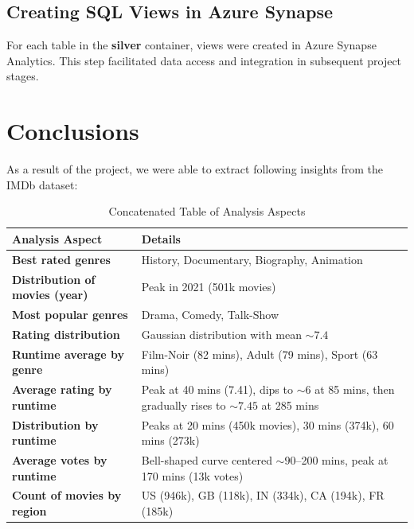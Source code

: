 \documentclass[a4paper,12pt]{article}
\begin{document}
\subsection{Creating SQL Views in Azure Synapse}
For each table in the \textbf{silver} container, views were created in Azure Synapse Analytics. This step facilitated data access and integration in subsequent project stages.

\section{Conclusions}
\label{sec:conclusions}

As a result of the project, we were able to extract following insights from the IMDb dataset:

\begin{table}[ht]
    \centering
    \begin{tabular}{|l|p{10cm}|}
    \hline
    \textbf{Analysis Aspect} & \textbf{Details} \\
    \hline
    \textbf{Best rated genres} & History, Documentary, Biography, Animation \\
    \hline
    \textbf{Distribution of movies (year)} & Peak in 2021 (501k movies) \\
    \hline
    \textbf{Most popular genres} & Drama, Comedy, Talk-Show \\
    \hline
    \textbf{Rating distribution} & Gaussian distribution with mean \(\sim 7.4\) \\
    \hline
    \textbf{Runtime average by genre} & Film-Noir (82 mins), Adult (79 mins), Sport (63 mins) \\
    \hline
    \textbf{Average rating by runtime} & Peak at 40 mins (7.41), dips to \(\sim 6\) at 85 mins, then gradually rises to \(\sim 7.45\) at 285 mins \\
    \hline
    \textbf{Distribution by runtime} & Peaks at 20 mins (450k movies), 30 mins (374k), 60 mins (273k) \\
    \hline
    \textbf{Average votes by runtime} & Bell-shaped curve centered \(\sim 90\)–200 mins, peak at 170 mins (13k votes) \\
    \hline
    \textbf{Count of movies by region} & US (946k), GB (118k), IN (334k), CA (194k), FR (185k) \\
    \hline
    \end{tabular}
    \caption{Concatenated Table of Analysis Aspects}
    \label{tab:analysis_aspects}
\end{table}
    
\end{document}
